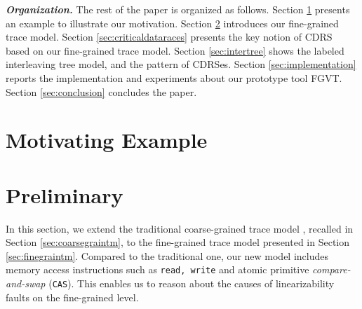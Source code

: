 \documentclass[runningheads]{llncs}
\begin{document}
\noindent\textbf{\textit{Organization.}} The rest of the paper is organized as follows. Section \ref{sec:motivatingeg} presents an example to illustrate our motivation. Section \ref{sec:fgtracemodel} introduces our fine-grained trace model. Section \ref{sec:criticaldataraces} presents the key notion of CDRS based on our fine-grained trace model. Section \ref{sec:intertree} shows the labeled interleaving tree model, and the pattern of CDRSes. Section \ref{sec:implementation} reports the implementation and experiments about our prototype tool FGVT. Section \ref{sec:conclusion} concludes the paper.

\section{Motivating Example}\label{sec:motivatingeg}


\vspace{-0.5cm}

\section{Preliminary}\label{sec:fgtracemodel}


In this section, we extend the traditional coarse-grained trace model \cite{DBLP:conf/popl/BouajjaniEEH15}, recalled in Section \ref{sec:coarsegraintm}, to the fine-grained trace model presented in Section \ref{sec:finegraintm}. Compared to the traditional one, our new model includes memory access instructions such as \texttt{read, write} and atomic primitive \textit{compare-and-swap} (\texttt{CAS}). This enables us to reason about the causes of linearizability faults on the fine-grained level.
\end{document}
